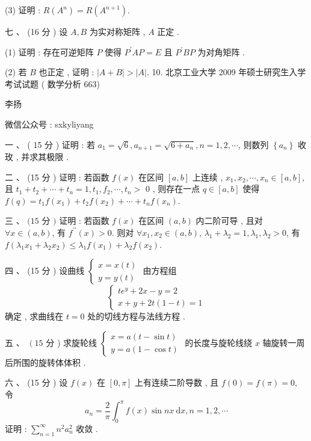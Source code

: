 \documentclass[10pt]{article}
\begin{document}
{(3)  证明 : $R\left(A^{n}\right)=R\left(A^{n+1}\right)$.

 七 、 (16  分 )  设  $A, B$  为实对称矩阵 , $A$  正定 .

(1)  证明 :  存在可逆矩阵  $P$  使得  $P^{\prime} A P=E$  且  $P^{\prime} B P$  为对角矩阵 .

(2)  若  $B$  也正定 ,  证明 : $|A+B|>|A|$. 10.  北京工业大学  2009  年硕士研究生入学考试试题 ( 数学分析 663)

 李扬 

 微信公众号 : sxkyliyang

 一 、 ( 15  分 )  证明 :  若  $a_{1}=\sqrt{6}, a_{n+1}=\sqrt{6+a_{n}}, n=1,2, \cdots$,  则数列  $\left\{a_{n}\right\}$  收玫 ,  并求其极限 .

 二 、 (15  分 )  证明 :  若函数  $f(x)$  在区间  $[a, b]$  上连续 , $x_{1}, x_{2}, \cdots, x_{n} \in[a, b]$,  且  $t_{1}+t_{2}+\cdots+t_{n}=1, t_{1}, f_{2}, \cdots, t_{n}>$ 0 ,  则存在一点  $q \in[a, b]$  使得  $f(q)=t_{1} f\left(x_{1}\right)+t_{2} f\left(x_{2}\right)+\cdots+t_{n} f\left(x_{n}\right)$.

 三 、 $(15$  分  $)$  证明 :  若函数  $f(x)$  在区间  $(a, b)$  内二阶可导 ,  且对  $\forall x \in(a, b)$,  有  $f^{\prime \prime}(x)>0$.  则对  $\forall x_{1}, x_{2} \in(a, b)$, $\lambda_{1}+\lambda_{2}=1, \lambda_{1}, \lambda_{2}>0$,  有  $f\left(\lambda_{1} x_{1}+\lambda_{2} x_{2}\right) \leq \lambda_{1} f\left(x_{1}\right)+\lambda_{2} f\left(x_{2}\right)$.

 四 、 (15  分 )  设曲线  $\left\{\begin{array}{l}x=x(t) \\ y=y(t)\end{array}\right.$  由方程组 
$$
\left\{\begin{array}{l}
t e^{y}+2 x-y=2 \\
x+y+2 t(1-t)=1
\end{array}\right.
$$
 确定 ,  求曲线在  $t=0$  处的切线方程与法线方程 .

 五 、 $\left(15\right.$  分 )  求旋轮线  $\left\{\begin{array}{l}x=a(t-\sin t) \\ y=a(1-\cos t)\end{array}\right.$  的长度与旋轮线绕  $x$  轴旋转一周后所围的旋转体体积 .

 六 、 (15  分 )  设  $f(x)$  在  $[0, \pi]$  上有连续二阶导数 ,  且  $f(0)=f(\pi)=0$,  令 
$$
a_{n}=\frac{2}{\pi} \int_{0}^{\pi} f(x) \sin n x \mathrm{~d} x, n=1,2, \cdots
$$
 证明 : $\sum_{n=1}^{\infty} n^{2} a_{n}^{2}$  收敛 .

}
\end{document}
